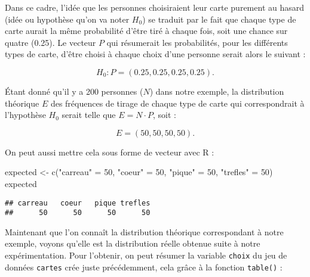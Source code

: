 \documentclass[
]{book}
\newenvironment{Shaded}{\begin{snugshade}}{\end{snugshade}}
\newcommand{\CommentTok}[1]{\textcolor[rgb]{0.56,0.35,0.01}{\textit{#1}}}
\newcommand{\DecValTok}[1]{\textcolor[rgb]{0.00,0.00,0.81}{#1}}
\newcommand{\FunctionTok}[1]{\textcolor[rgb]{0.00,0.00,0.00}{#1}}
\newcommand{\NormalTok}[1]{#1}
\newcommand{\OtherTok}[1]{\textcolor[rgb]{0.56,0.35,0.01}{#1}}
\newcommand{\SpecialCharTok}[1]{\textcolor[rgb]{0.00,0.00,0.00}{#1}}
\newcommand{\StringTok}[1]{\textcolor[rgb]{0.31,0.60,0.02}{#1}}
\begin{document}
Dans ce cadre, l'idée que les personnes choisiraient leur carte purement au hasard (idée ou hypothèse qu'on va noter \(H_{0}\)) se traduit par le fait que chaque type de carte aurait la même probabilité d'être tiré à chaque fois, soit une chance sur quatre (0.25). Le vecteur \(P\) qui résumerait les probabilités, pour les différents types de carte, d'être choisi à chaque choix d'une personne serait alors le suivant :

\[H_{0} : P = (0.25, 0.25, 0.25, 0.25).\]

Étant donné qu'il y a 200 personnes (\(N\)) dans notre exemple, la distribution théorique \(E\) des fréquences de tirage de chaque type de carte qui correspondrait à l'hypothèse \(H_{0}\) serait telle que \(E = N \cdot P\), soit :

\[E = (50, 50, 50, 50).\]

On peut aussi mettre cela sous forme de vecteur avec R :

\begin{Shaded}
\begin{Highlighting}[]
\NormalTok{expected }\OtherTok{\textless{}{-}} \FunctionTok{c}\NormalTok{(}\StringTok{"carreau"} \OtherTok{=} \DecValTok{50}\NormalTok{, }\StringTok{"coeur"} \OtherTok{=} \DecValTok{50}\NormalTok{, }\StringTok{"pique"} \OtherTok{=} \DecValTok{50}\NormalTok{, }\StringTok{"trefles"} \OtherTok{=} \DecValTok{50}\NormalTok{)}
\NormalTok{expected}
\end{Highlighting}
\end{Shaded}

\begin{verbatim}
## carreau   coeur   pique trefles 
##      50      50      50      50
\end{verbatim}

Maintenant que l'on connaît la distribution théorique correspondant à notre exemple, voyons qu'elle est la distribution réelle obtenue suite à notre expérimentation. Pour l'obtenir, on peut résumer la variable \texttt{choix} du jeu de données \texttt{cartes} crée juste précédemment, cela grâce à la fonction \texttt{table()} :

\begin{Shaded}
\end{Shaded}
\end{document}
